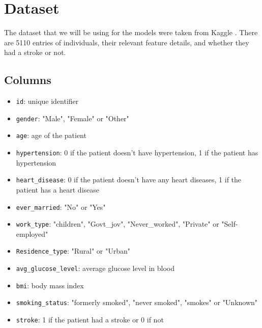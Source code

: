 \section{Dataset}
\label{sec:dataset}
The dataset that we will be using for the models were taken from Kaggle \cite{Kaggle}. There are 5110 entries of individuals, their relevant feature details, and whether they had a stroke or not.

\subsection{Columns}
\label{sec:dataset:Columns}
\begin{itemize}
    \item \verb|id|: unique identifier
    \item \verb|gender|: "Male", "Female" or "Other"
    \item \verb|age|: age of the patient
    \item \verb|hypertension|: 0 if the patient doesn't have hypertension, 1 if the patient has hypertension
    \item \verb|heart_disease|: 0 if the patient doesn't have any heart diseases, 1 if the patient has a heart disease
    \item \verb|ever_married|: "No" or "Yes"
    \item \verb|work_type|: "children", "Govt\_jov", "Never\_worked", "Private" or "Self-employed"
    \item \verb|Residence_type|: "Rural" or "Urban"
    \item \verb|avg_glucose_level|: average glucose level in blood
    \item \verb|bmi|: body mass index
    \item \verb|smoking_status|: "formerly smoked", "never smoked", "smokes" or "Unknown"
    \item \verb|stroke|: 1 if the patient had a stroke or 0 if not

\end{itemize}
